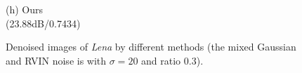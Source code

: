 \documentclass[runningheads]{llncs}
\begin{document}
\begin{figure}
{\begin{minipage}[t]{0.244\textwidth}
{\footnotesize (h) Ours \\(23.88dB/0.7434)}
\end{minipage}
}
\caption{Denoised images of \textsl{Lena} by different methods (the mixed Gaussian and RVIN noise is with $\sigma = 20$ and ratio $0.3$).}
\label{fig15}
\end{figure}

\begin{figure}
\centering
{}
\end{figure}
\end{document}
